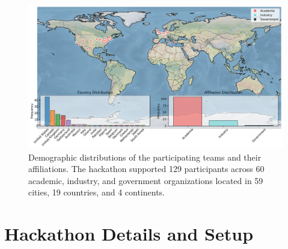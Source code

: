 \documentclass[superscriptaddress, nofootinbib,  amsmath, amssymb, twocolumn]{revtex4-2} %
\begin{document}
\begin{figure}
    \centering
    \includegraphics[width=0.95\linewidth]{latex/figures/world_map.png}
    \caption{Demographic distributions of the participating teams and their affiliations. The hackathon supported 129 participants across 60 academic, industry, and government organizations located in 59 cities, 19 countries, and 4 continents. \label{fig:map} }
\end{figure}








\section{Hackathon Details and Setup}
\end{document}
